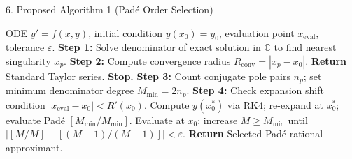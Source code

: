 \documentclass[aspectratio=169]{beamer}
\newcommand{\C}{\mathbb{C}}
\newcommand{\Rconv}{R_{\mathrm{conv}}}
\begin{document}
\begin{frame}{6. Proposed Algorithm 1 (Padé Order Selection)}
  \centering
  \begin{minipage}{0.95\textwidth}
    \begin{algorithm}[H]
      \tiny
      \caption{Automated Padé Order Selection from Singularity Structure}
      \begin{algorithmic}[1]
        \Require ODE $y' = f(x,y)$, initial condition $y(x_0)=y_0$, evaluation point $x_{\mathrm{eval}}$, tolerance $\varepsilon$.
        \State \textbf{Step 1:} Solve denominator of exact solution in $\C$ to find nearest singularity $x_p$.
        \State \textbf{Step 2:} Compute convergence radius $\Rconv = |x_p - x_0|$.
        \If{$|x_{\mathrm{eval}} - x_0| \leq \Rconv$}
          \State \textbf{Return} Standard Taylor series. \textbf{Stop.}
        \EndIf
        \State \textbf{Step 3:} Count conjugate pole pairs $n_p$; set minimum denominator degree $M_{\min} = 2 n_p$.
        \State \textbf{Step 4:} Check expansion shift condition $|x_{\mathrm{eval}} - x_0| < R'(x_0)$.
          \State Compute $y(x_0^*)$ via RK4; re-expand at $x_0^*$; evaluate Padé $[M_{\min}/M_{\min}]$.
        \Else
          \State Evaluate at $x_0$; increase $M \ge M_{\min}$ until $|[M/M] - [(M{-}1)/(M{-}1)]| < \varepsilon$.
        \EndIf
        \State \textbf{Return} Selected Padé rational approximant.
      \end{algorithmic}
    \end{algorithm}
  \end{minipage}
  \vskip4pt
\end{frame}
\end{document}
